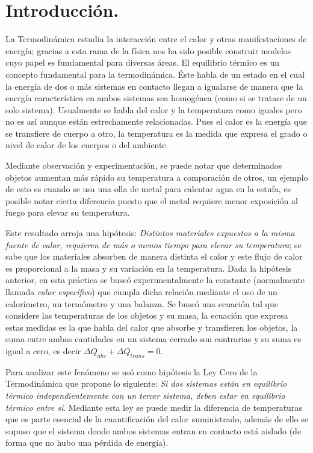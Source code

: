 \documentclass[a4paper]{article}
\begin{document}
\section*{Introducción.}
La Termodinámica estudia la interacción entre el calor y otras manifestaciones de energía; gracias a esta rama de la física nos ha sido posible construir modelos cuyo papel es  fundamental para diversas áreas. El equilibrio térmico es un concepto fundamental para la termodinámica. Éste habla de un estado en el cual la energía de dos o más sistemas en contacto llegan a igualarse de manera que la energía característica en ambos sistemas sea homogénea (como si se tratase de un solo sistema). Usualmente se habla del calor y la temperatura como iguales pero no es así aunque están estrechamente relacionadas. Pues el calor es la energía que se transfiere de cuerpo a otro, la temperatura es la medida que expresa el grado o nivel de calor de los cuerpos o del ambiente.

Mediante observación y experimentación, se puede notar que determinados objetos aumentan más rápido su temperatura a comparación de otros, un ejemplo de esto es cuando se usa una olla de metal para calentar agua  en la estufa, es posible notar cierta diferencia puesto que el metal requiere menor exposición al fuego para elevar su temperatura. 

Este resultado arroja una hipótesis: \textit{Distintos materiales expuestos a la misma fuente de calor, requieren de más o menos tiempo para elevar su temperatura}; se sabe que los materiales absorben de manera distinta el calor y este flujo de calor es proporcional a la masa y su variación en la temperatura. Dada la hipótesis anterior, en esta práctica se buscó experimentalmente la constante (normalmente llamada \textit{calor específico}) que cumpla dicha relación mediante el uso de un calorímetro, un termómetro y una balanza. Se buscó una ecuación tal que considere las temperaturas de los objetos y su masa, la ecuación que expresa estas medidas es la que habla del calor que absorbe y transfieren los objetos, la suma entre ambas cantidades en un sistema cerrado son contrarias y su suma es igual a cero, es decir $\Delta Q_{abs} + \Delta Q_{trans} = 0$.

Para analizar este fenómeno se usó como hipótesis la Ley Cero de la Termodinámica que propone lo siguiente: \textit{Si dos sistemas están en equilibrio térmico independientemente con un tercer sistema, deben estar en equilibrio térmico entre sí}. Mediante esta ley se puede medir la diferencia de temperaturas que es parte esencial de la cuantificación del calor suministrado, además de ello se supuso que el sistema donde ambos sistemas entran en contacto está aislado (de forma que no hubo una pérdida de energía). 
\end{document}
